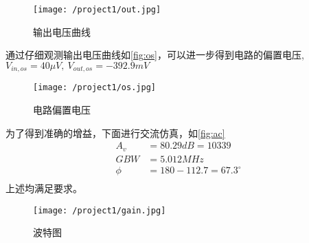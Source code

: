     \begin{figure}[H]
        \centering
        \texttt{[image: /project1/out.jpg]}
        \caption{\label{fig:out}输出电压曲线}
    \end{figure}
    \indent 通过仔细观测输出电压曲线如\autoref{fig:os}，可以进一步得到电路的偏置电压, 
    $ V_{in,os} = 40\mu V,\ V_{out,os} = -392.9mV $ \\
    \begin{figure}[H]
        \centering
        \texttt{[image: /project1/os.jpg]}
        \caption{\label{fig:os}电路偏置电压}
    \end{figure}
    \indent 为了得到准确的增益，下面进行交流仿真，如\autoref{fig:ac}
    \begin{align}
        A_v & = 80.29dB = 10339 \\
        GBW & = 5.012MHz \\
        \phi & = 180-112.7 = 67.3^\circ \\
    \end{align} 
    \indent 上述均满足要求。\\ 
    \begin{figure}[H]
        \centering
        \texttt{[image: /project1/gain.jpg]}
        \caption{\label{fig:ac}波特图}
    \end{figure}

